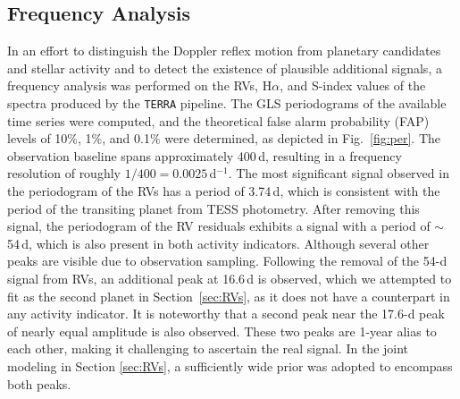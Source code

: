 \documentclass[traditabstract,longauth]{aa}
\begin{document}
\subsection{Frequency Analysis}\label{sec:Freq}

In an effort to distinguish the Doppler reflex motion from planetary candidates and stellar activity and to detect the existence of plausible additional signals, 
a frequency analysis was performed on the RVs, H$\alpha$, and S-index values of the spectra produced by the {\tt TERRA} pipeline. The GLS periodograms \citep{Zechmeister09} of the available time series were computed, and the theoretical false alarm probability (FAP) levels of 10\%, 1\%, and 0.1\% were determined, as depicted in Fig.~\ref{fig:per}. The observation baseline spans approximately 400\,d, resulting in a frequency resolution of roughly $1/400=0.0025$\,d$^{-1}$. The most significant signal observed in the periodogram of the RVs has a period of 3.74\,d, which is consistent with the period of the transiting planet from TESS photometry. After removing this signal, the periodogram of the RV residuals exhibits a signal with a period of $\sim$54\,d, which is also present in both activity indicators. Although several other peaks are visible due to observation sampling. Following the removal of the 54-d signal from RVs, an additional peak at 16.6\,d is observed, which we attempted to fit as the second planet in Section~\ref{sec:RVs}, as it does not have a counterpart in any activity indicator. It is noteworthy that a second peak near the 17.6-d peak of nearly equal amplitude is also observed. These two peaks are 1-year alias to each other, making it challenging to ascertain the real signal. In the joint modeling in Section \ref{sec:RVs}, a sufficiently wide prior was adopted to encompass both peaks.
\end{document}
